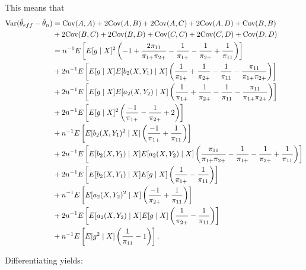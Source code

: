 \begin{itemize}
    This means that
    \begin{align*}
      {\text{Var}}(\hat \theta_{eff} - \hat \theta_n) 
      &= {\text{Cov}}(A, A) + 2 {\text{Cov}}(A, B) + 2 {\text{Cov}}(A, C) + 2 {\text{Cov}}(A, D) + {\text{Cov}}(B, B) \\
      &+ 2 {\text{Cov}}(B, C) + 2 {\text{Cov}}(B, D) + {\text{Cov}}(C, C) + 2 {\text{Cov}}(C, D) + {\text{Cov}}(D, D) \\
      &= n^{-1} E \left[ E[g \mid X]^2 \left(-1 + \frac{2 \pi_{11}}{\pi_{1+}
      \pi_{2+}} - \frac{1}{\pi_{1+}} - \frac{1}{\pi_{2+}} +
      \frac{1}{\pi_{11}}\right)\right] \\
      &+ 2 n^{-1} E\left[E[g \mid X] E[b_2(X, Y_1) \mid X]
      \left(\frac{1}{\pi_{1+}} + \frac{1}{\pi_{2+}} - \frac{1}{\pi_{11}} -
      \frac{\pi_{11}}{\pi_{1+} \pi_{2+}}\right)\right]\\
      &+ 2 n^{-1} E\left[E[g \mid X] E[a_2(X, Y_2) \mid X]
      \left(\frac{1}{\pi_{1+}} + \frac{1}{\pi_{2+}} - \frac{1}{\pi_{11}} -
      \frac{\pi_{11}}{\pi_{1+} \pi_{2+}}\right)\right]\\
      &+ 2 n^{-1} E\left[E[g \mid X]^2 \left(\frac{-1}{\pi_{1+}} -
      \frac{1}{\pi_{2+}} + 2\right)\right]\\
      &+ n^{-1} E\left[ E[b_2(X, Y_1)^2 \mid X] \left(\frac{-1}{\pi_{1+}} +
      \frac{1}{\pi_{11}}\right)\right]\\
      &+ 2 n^{-1} E\left[E[b_2(X, Y_1) \mid X] E[a_2(X, Y_2) \mid X]
      \left(\frac{\pi_{11}}{\pi_{1+} \pi_{2+}} - \frac{1}{\pi_{1+}} -
      \frac{1}{\pi_{2+}} + \frac{1}{\pi_{11}}\right)\right]\\
      &+ 2 n^{-1} E\left[ E[b_2(X, Y_1) \mid X] E[g \mid X]
      \left(\frac{1}{\pi_{1+}} - \frac{1}{\pi_{11}}\right)\right]\\
      &+  n^{-1} E\left[ E[a_2(X, Y_2)^2 \mid X]
      \left(\frac{-1}{\pi_{2+}} + \frac{1}{\pi_{11}}\right) \right]\\
      &+ 2 n^{-1} E\left[ E[a_2(X, Y_2) \mid X] E[g \mid X]
      \left(\frac{1}{\pi_{2+}} - \frac{1}{\pi_{11}}\right)\right]\\
      &+ n^{-1} E\left[ E[g^2 \mid X] \left(\frac{1}{\pi_{11}} -
      1\right)\right].
    \end{align*}

    Differentiating yields:


\end{itemize}
